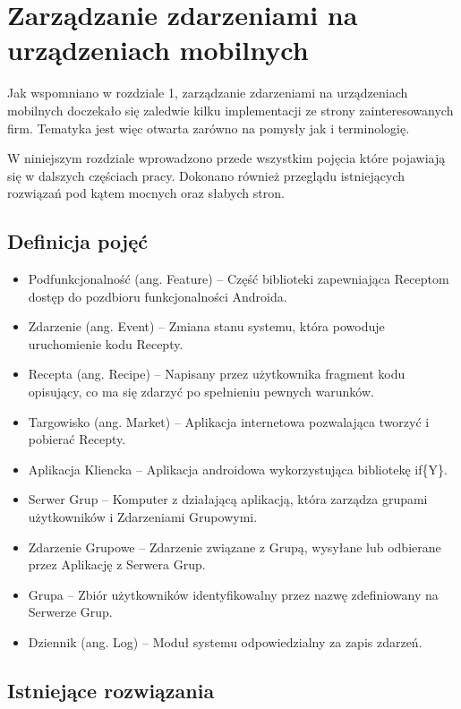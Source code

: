 \documentclass[11pt,a4paper,polish,thesis]{dcsbook}
\begin{document}
\chapter{Zarządzanie zdarzeniami na urządzeniach mobilnych}
Jak wspomniano w rozdziale 1, zarządzanie zdarzeniami na urządzeniach mobilnych doczekało się zaledwie kilku implementacji ze strony zainteresowanych firm.
Tematyka jest więc otwarta zarówno na pomysły jak i terminologię.

W niniejszym rozdziale wprowadzono przede wszystkim pojęcia które pojawiają się w dalszych częściach pracy. Dokonano również przeglądu istniejących rozwiązań
pod kątem mocnych oraz słabych stron.

\section{Definicja pojęć}
\begin{itemize}
\item Podfunkcjonalność (ang. Feature) -- Część biblioteki zapewniająca Receptom dostęp do pozdbioru funkcjonalności Androida.
\item Zdarzenie (ang. Event) -- Zmiana stanu systemu, która powoduje uruchomienie kodu Recepty.
\item Recepta (ang. Recipe) -- Napisany przez użytkownika fragment kodu opisujący, co ma się zdarzyć po spełnieniu pewnych warunków.
\item Targowisko (ang. Market) -- Aplikacja internetowa pozwalająca tworzyć i pobierać Recepty.
\item Aplikacja Kliencka -- Aplikacja androidowa wykorzystująca bibliotekę if\{Y\}. 
\item Serwer Grup -- Komputer z działającą aplikacją, która zarządza grupami użytkowników i Zdarzeniami Grupowymi.
\item Zdarzenie Grupowe -- Zdarzenie związane z Grupą, wysyłane lub odbierane przez Aplikację z Serwera Grup.
\item Grupa -- Zbiór użytkowników identyfikowalny przez nazwę zdefiniowany na Serwerze Grup.
\item Dziennik (ang. Log) -- Moduł systemu odpowiedzialny za zapis zdarzeń.
\end{itemize}
\section{Istniejące rozwiązania} %
\end{document}

